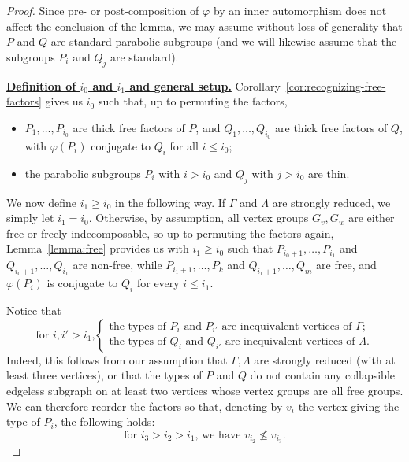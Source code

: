 \documentclass[a4paper,english,11pt]{article}
\theoremstyle{definition}
\theoremstyle{remark}
\begin{document}
\begin{proof}
Since pre- or post-composition of $\varphi$ by an inner automorphism does not affect the conclusion of the lemma, we may assume without loss of generality that $P$ and $Q$ are standard parabolic subgroups (and we will likewise assume that the subgroups $P_i$ and $Q_j$ are standard).

\medskip

\underline{\textbf{Definition of $i_0$ and $i_1$ and general setup.}} Corollary~\ref{cor:recognizing-free-factors} gives us $i_0$ such that, up to permuting the factors,
\begin{itemize}
\item $P_1,\dots,P_{i_0}$ are thick free factors of $P$, and $Q_1,\dots,Q_{i_0}$ are thick free factors of $Q$, with $\varphi(P_i)$ conjugate to $Q_i$ for all $i\le i_0$; 
\item the parabolic subgroups $P_i$ with $i>i_0$ and $Q_j$ with $j>i_0$ are thin. 
\end{itemize}
We now define $i_1\ge i_0$ in the following way. If $\Gamma$ and $\Lambda$ are strongly reduced, we simply let $i_1=i_0$. Otherwise, by assumption, all vertex groups $G_v,G_w$ are either free or freely indecomposable, so up to permuting the factors again, Lemma~\ref{lemma:free} provides us with $i_1\ge i_0$ such that $P_{i_0+1},\dots,P_{i_1}$ and $Q_{i_0+1},\dots,Q_{i_1}$ are non-free, while $P_{i_1+1},\dots,P_k$ and $Q_{i_1+1},\dots,Q_m$ are free, and $\varphi(P_i)$ is conjugate to $Q_i$ for every $i\le i_1$.

Notice that 
\begin{equation}\label{inequivalent}\tag{$\star$}
\text{for $i,i'>i_1$,} \begin{cases} \text{the types of $P_i$ and $P_{i'}$ are inequivalent vertices of $\Gamma$;} \\ \text{the types of $Q_i$ and $Q_{i'}$ are inequivalent vertices of $\Lambda$.}\end{cases}
\end{equation}
Indeed, this follows from our assumption that $\Gamma,\Lambda$ are strongly reduced (with at least three vertices), or that the types of $P$ and $Q$ do not contain any collapsible edgeless subgraph on at least two vertices whose vertex groups are all free groups. We can therefore reorder the factors so that, denoting by $v_i$ the vertex giving the type of $P_i$, the following holds: 
\begin{equation}\label{ordering}\tag{$\star\star$}
\text{for $i_3>i_2>i_1$, we have $v_{i_2}\not\le v_{i_3}$.} 
\end{equation}


\end{proof}
\end{document}
